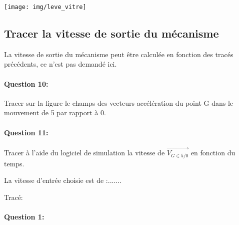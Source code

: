 \texttt{[image: img/leve\_vitre]}

\subsection{Tracer la vitesse de sortie du mécanisme}

La vitesse de sortie du mécanisme peut être calculée en fonction des tracés précédents, ce n'est pas demandé ici.

\paragraph{Question 10:} Tracer sur la figure le champs des vecteurs accélération du point G dans le mouvement de 5 par rapport à 0.

\paragraph{Question 11:} Tracer à l'aide du logiciel de simulation la vitesse de $\overrightarrow{V_{G\in 5/0}}$ en fonction du temps.

\newpage

La vitesse d'entrée choisie est de :.......

Tracé:
\vspace{10cm}




\pagestyle{correction}\setcounter{section}{0}

\paragraph{Question 1:}
